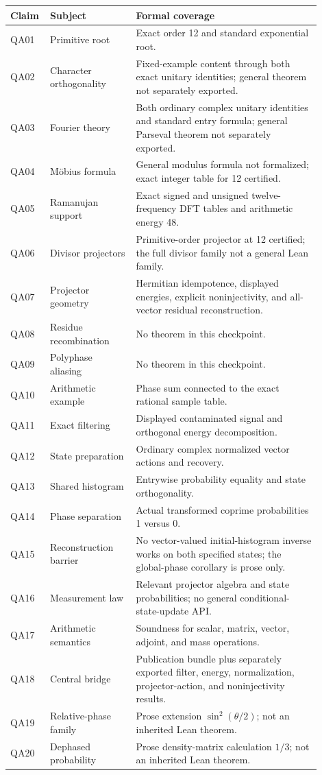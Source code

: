 \small
\begin{longtable}{p{0.08\linewidth}p{0.26\linewidth}p{0.56\linewidth}}
\toprule
Claim & Subject & Formal coverage\\
\midrule
\endhead
QA01 & Primitive root & Exact order 12 and standard exponential root.\\
QA02 & Character orthogonality & Fixed-example content through both exact unitary identities; general theorem not separately exported.\\
QA03 & Fourier theory & Both ordinary complex unitary identities and standard entry formula; general Parseval theorem not separately exported.\\
QA04 & M\"obius formula & General modulus formula not formalized; exact integer table for 12 certified.\\
QA05 & Ramanujan support & Exact signed and unsigned twelve-frequency DFT tables and arithmetic energy 48.\\
QA06 & Divisor projectors & Primitive-order projector at 12 certified; the full divisor family not a general Lean family.\\
QA07 & Projector geometry & Hermitian idempotence, displayed energies, explicit noninjectivity, and all-vector residual reconstruction.\\
QA08 & Residue recombination & No theorem in this checkpoint.\\
QA09 & Polyphase aliasing & No theorem in this checkpoint.\\
QA10 & Arithmetic example & Phase sum connected to the exact rational sample table.\\
QA11 & Exact filtering & Displayed contaminated signal and orthogonal energy decomposition.\\
QA12 & State preparation & Ordinary complex normalized vector actions and recovery.\\
QA13 & Shared histogram & Entrywise probability equality and state orthogonality.\\
QA14 & Phase separation & Actual transformed coprime probabilities 1 versus 0.\\
QA15 & Reconstruction barrier & No vector-valued initial-histogram inverse works on both specified states; the global-phase corollary is prose only.\\
QA16 & Measurement law & Relevant projector algebra and state probabilities; no general conditional-state-update API.\\
QA17 & Arithmetic semantics & Soundness for scalar, matrix, vector, adjoint, and mass operations.\\
QA18 & Central bridge & Publication bundle plus separately exported filter, energy, normalization, projector-action, and noninjectivity results.\\
QA19 & Relative-phase family & Prose extension \(\sin^2(\theta/2)\); not an inherited Lean theorem.\\
QA20 & Dephased probability & Prose density-matrix calculation \(1/3\); not an inherited Lean theorem.\\
\bottomrule
\end{longtable}
\normalsize

